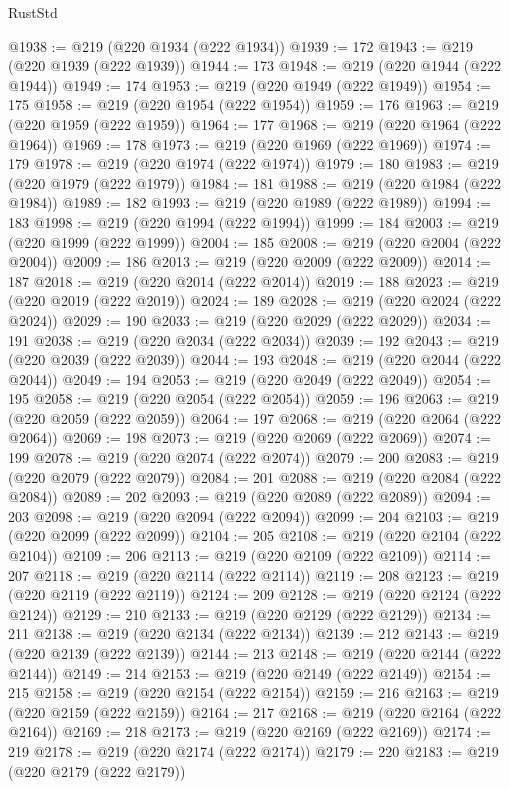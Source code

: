 \begin{lexlean}{RustStd}
\begin{coremodule}
@1938 := @219 (@220 @1934 (@222 @1934))
@1939 := 172
@1943 := @219 (@220 @1939 (@222 @1939))
@1944 := 173
@1948 := @219 (@220 @1944 (@222 @1944))
@1949 := 174
@1953 := @219 (@220 @1949 (@222 @1949))
@1954 := 175
@1958 := @219 (@220 @1954 (@222 @1954))
@1959 := 176
@1963 := @219 (@220 @1959 (@222 @1959))
@1964 := 177
@1968 := @219 (@220 @1964 (@222 @1964))
@1969 := 178
@1973 := @219 (@220 @1969 (@222 @1969))
@1974 := 179
@1978 := @219 (@220 @1974 (@222 @1974))
@1979 := 180
@1983 := @219 (@220 @1979 (@222 @1979))
@1984 := 181
@1988 := @219 (@220 @1984 (@222 @1984))
@1989 := 182
@1993 := @219 (@220 @1989 (@222 @1989))
@1994 := 183
@1998 := @219 (@220 @1994 (@222 @1994))
@1999 := 184
@2003 := @219 (@220 @1999 (@222 @1999))
@2004 := 185
@2008 := @219 (@220 @2004 (@222 @2004))
@2009 := 186
@2013 := @219 (@220 @2009 (@222 @2009))
@2014 := 187
@2018 := @219 (@220 @2014 (@222 @2014))
@2019 := 188
@2023 := @219 (@220 @2019 (@222 @2019))
@2024 := 189
@2028 := @219 (@220 @2024 (@222 @2024))
@2029 := 190
@2033 := @219 (@220 @2029 (@222 @2029))
@2034 := 191
@2038 := @219 (@220 @2034 (@222 @2034))
@2039 := 192
@2043 := @219 (@220 @2039 (@222 @2039))
@2044 := 193
@2048 := @219 (@220 @2044 (@222 @2044))
@2049 := 194
@2053 := @219 (@220 @2049 (@222 @2049))
@2054 := 195
@2058 := @219 (@220 @2054 (@222 @2054))
@2059 := 196
@2063 := @219 (@220 @2059 (@222 @2059))
@2064 := 197
@2068 := @219 (@220 @2064 (@222 @2064))
@2069 := 198
@2073 := @219 (@220 @2069 (@222 @2069))
@2074 := 199
@2078 := @219 (@220 @2074 (@222 @2074))
@2079 := 200
@2083 := @219 (@220 @2079 (@222 @2079))
@2084 := 201
@2088 := @219 (@220 @2084 (@222 @2084))
@2089 := 202
@2093 := @219 (@220 @2089 (@222 @2089))
@2094 := 203
@2098 := @219 (@220 @2094 (@222 @2094))
@2099 := 204
@2103 := @219 (@220 @2099 (@222 @2099))
@2104 := 205
@2108 := @219 (@220 @2104 (@222 @2104))
@2109 := 206
@2113 := @219 (@220 @2109 (@222 @2109))
@2114 := 207
@2118 := @219 (@220 @2114 (@222 @2114))
@2119 := 208
@2123 := @219 (@220 @2119 (@222 @2119))
@2124 := 209
@2128 := @219 (@220 @2124 (@222 @2124))
@2129 := 210
@2133 := @219 (@220 @2129 (@222 @2129))
@2134 := 211
@2138 := @219 (@220 @2134 (@222 @2134))
@2139 := 212
@2143 := @219 (@220 @2139 (@222 @2139))
@2144 := 213
@2148 := @219 (@220 @2144 (@222 @2144))
@2149 := 214
@2153 := @219 (@220 @2149 (@222 @2149))
@2154 := 215
@2158 := @219 (@220 @2154 (@222 @2154))
@2159 := 216
@2163 := @219 (@220 @2159 (@222 @2159))
@2164 := 217
@2168 := @219 (@220 @2164 (@222 @2164))
@2169 := 218
@2173 := @219 (@220 @2169 (@222 @2169))
@2174 := 219
@2178 := @219 (@220 @2174 (@222 @2174))
@2179 := 220
@2183 := @219 (@220 @2179 (@222 @2179))

\end{coremodule}
\end{lexlean}
